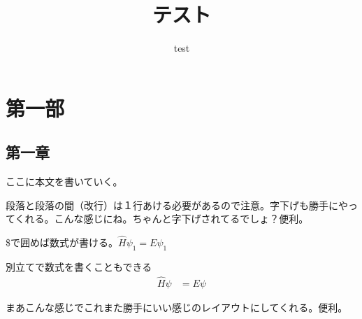 \documentclass[ja=standard,xelatex]{bxjsarticle}
\title{テスト}
\subtitle{test}
\author{}%
\date{}%
\begin{document}
\maketitle
\section{第一部}
\subsection{第一章}
ここに本文を書いていく。

段落と段落の間（改行）は１行あける必要があるので注意。字下げも勝手にやってくれる。こんな感じにね。ちゃんと字下げされてるでしょ？便利。

\$で囲めば数式が書ける。$\hat{H}\psi_1 = E\psi_1$

別立てで数式を書くこともできる
\begin{align}
    \hat{H}\psi &= E\psi
\end{align}

まあこんな感じでこれまた勝手にいい感じのレイアウトにしてくれる。便利。
\end{document}
